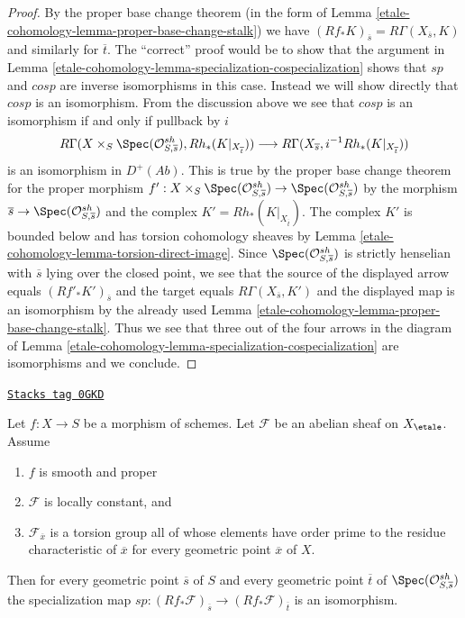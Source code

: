 \begin{proof}
By the proper base change theorem (in the form of
Lemma \ref{etale-cohomology-lemma-proper-base-change-stalk}) we have
$(Rf_*K)_{\overline{s}} = R\Gamma(X_{\overline{s}}, K)$
and similarly for $\overline{t}$. The ``correct'' proof would be
to show that the argument in
Lemma \ref{etale-cohomology-lemma-specialization-cospecialization}
shows that $sp$ and $cosp$ are inverse isomorphisms in this case.
Instead we will show directly that $cosp$ is an isomorphism.
From the discussion above we see that $cosp$ is an isomorphism
if and only if pullback by $i$
$$
R\Gamma(X \times_S \Spec(\mathcal{O}^{sh}_{S, \overline{s}}),
Rh_*(K|_{X_{\overline{t}}}))
\longrightarrow
R\Gamma(X_{\overline{s}}, i^{-1}Rh_*(K|_{X_{\overline{t}}}))
$$
is an isomorphism in $D^+(\textit{Ab})$. This is true by the proper
base change theorem for the proper morphism
$f' : X \times_S \Spec(\mathcal{O}^{sh}_{S, \overline{s}}) \to
\Spec(\mathcal{O}^{sh}_{S, \overline{s}})$
by the morphism $\overline{s} \to \Spec(\mathcal{O}^{sh}_{S, \overline{s}})$
and the complex $K' = Rh_*(K|_{X_{\overline{t}}})$. The complex
$K'$ is bounded below and has torsion cohomology sheaves
by Lemma \ref{etale-cohomology-lemma-torsion-direct-image}.
Since $\Spec(\mathcal{O}^{sh}_{S, \overline{s}})$ is strictly henselian
with $\overline{s}$ lying over the closed point,
we see that the source of the displayed arrow equals
$(Rf'_*K')_{\overline{s}}$ and the target equals
$R\Gamma(X_{\overline{s}}, K')$ and the displayed map is an isomorphism
by the already used
Lemma \ref{etale-cohomology-lemma-proper-base-change-stalk}.
Thus we see that three out of the four arrows in the diagram
of Lemma \ref{etale-cohomology-lemma-specialization-cospecialization} are isomorphisms
and we conclude.
\end{proof}

\begin{lemma}
\label{etale-cohomology-lemma-sp-isom-proper-loc-cst-torsion}
\href{https://stacks.math.columbia.edu/tag/0GKD}{\texttt{Stacks tag 0GKD}}

Let $f : X \to S$ be a morphism of schemes. Let $\mathcal{F}$
be an abelian sheaf on $X_\etale$. Assume
\begin{enumerate}
\item $f$ is smooth and proper
\item $\mathcal{F}$ is locally constant, and
\item $\mathcal{F}_{\overline{x}}$ is a torsion group all of
whose elements have order prime to the residue characteristic of
$\overline{x}$ for every geometric point $\overline{x}$ of $X$.
\end{enumerate}
Then for every geometric point $\overline{s}$ of $S$ and every geometric
point $\overline{t}$ of $\Spec(\mathcal{O}^{sh}_{S, \overline{s}})$
the specialization map
$sp : (Rf_*\mathcal{F})_{\overline{s}} \to (Rf_*\mathcal{F})_{\overline{t}}$
is an isomorphism.
\end{lemma}

